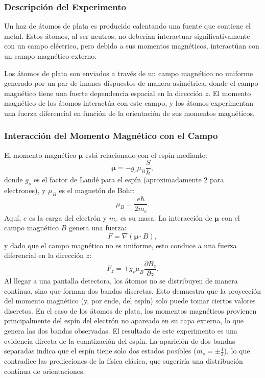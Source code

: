 \subsubsection*{Descripción del Experimento}
\noindent
Un haz de átomos de plata es producido calentando una fuente que contiene el metal. Estos átomos, al ser neutros, no deberían interactuar significativamente con un campo eléctrico, pero debido a sus momentos magnéticos, interactúan con un campo magnético externo. 

Los átomos de plata son enviados a través de un campo magnético no uniforme generado por un par de imanes dispuestos de manera asimétrica, donde el campo magnético tiene una fuerte dependencia espacial en la dirección $z$. El momento magnético de los átomos interactúa con este campo, y los átomos experimentan una fuerza diferencial en función de la orientación de sus momentos magnéticos.

\subsubsection*{Interacción del Momento Magnético con el Campo}
\noindent
El momento magnético $\boldsymbol{\mu}$ está relacionado con el espín mediante:
\[
\boldsymbol{\mu} = -g_s \mu_B \frac{{S}}{\hbar},
\]
donde $g_s$ es el factor de Landé para el espín (aproximadamente $2$ para electrones), y $\mu_B$ es el magnetón de Bohr:
\[
\mu_B = \frac{e\hbar}{2m_e}.
\]
Aquí, $e$ es la carga del electrón y $m_e$ es su masa.
\noindent
La interacción de $\boldsymbol{\mu}$ con el campo magnético ${B}$ genera una fuerza:
\[
{F} = \nabla(\boldsymbol{\mu} \cdot {B}),
\]
y dado que el campo magnético no es uniforme, esto conduce a una fuerza diferencial en la dirección $z$:
\[
F_z = \pm g_s \mu_B \frac{\partial B_z}{\partial z}.
\]
\noindent
Al llegar a una pantalla detectora, los átomos no se distribuyen de manera continua, sino que forman dos bandas discretas. Esto demuestra que la proyección del momento magnético (y, por ende, del espín) solo puede tomar ciertos valores discretos. En el caso de los átomos de plata, los momentos magnéticos provienen principalmente del espín del electrón no apareado en su capa externa, lo que genera las dos bandas observadas.
\noindent
El resultado de este experimento es una evidencia directa de la cuantización del espín. La aparición de dos bandas separadas indica que el espín tiene solo dos estados posibles ($m_s = \pm\frac{1}{2}$), lo que contradice las predicciones de la física clásica, que sugeriría una distribución continua de orientaciones.

